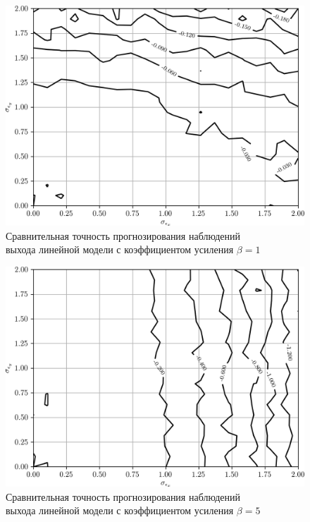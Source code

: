 \begin{figure}[p]
  \centering
  \includegraphics[width=135mm]{fig/linear/predict/beta-1_predict-measured.png}
  \caption{%
    Сравнительная точность прогнозирования наблюдений \\
    выхода линейной модели с коэффициентом усиления \( \beta = 1 \)
  }\label{fig:comparison_linear_predict_beta-1}
\end{figure}

\begin{figure}[p]
  \centering
  \includegraphics[width=135mm]{fig/linear/predict/beta-5_predict-measured.png}
  \caption{%
    Сравнительная точность прогнозирования наблюдений \\
    выхода линейной модели с коэффициентом усиления \( \beta = 5 \)
  }\label{fig:comparison_linear_predict_beta-5}
\end{figure}


